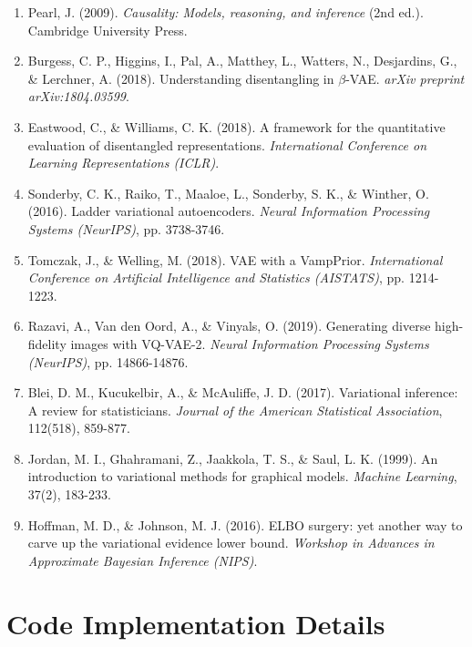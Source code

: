\documentclass[conference]{IEEEtran}
\begin{document}
\begin{enumerate}
    \item Pearl, J. (2009). \textit{Causality: Models, reasoning, and inference} (2nd ed.). Cambridge University Press.
    
    \item Burgess, C. P., Higgins, I., Pal, A., Matthey, L., Watters, N., Desjardins, G., \& Lerchner, A. (2018). Understanding disentangling in $\beta$-VAE. \textit{arXiv preprint arXiv:1804.03599}.
    
    \item Eastwood, C., \& Williams, C. K. (2018). A framework for the quantitative evaluation of disentangled representations. \textit{International Conference on Learning Representations (ICLR)}.
    
    \item Sonderby, C. K., Raiko, T., Maaloe, L., Sonderby, S. K., \& Winther, O. (2016). Ladder variational autoencoders. \textit{Neural Information Processing Systems (NeurIPS)}, pp. 3738-3746.
    
    \item Tomczak, J., \& Welling, M. (2018). VAE with a VampPrior. \textit{International Conference on Artificial Intelligence and Statistics (AISTATS)}, pp. 1214-1223.
    
    \item Razavi, A., Van den Oord, A., \& Vinyals, O. (2019). Generating diverse high-fidelity images with VQ-VAE-2. \textit{Neural Information Processing Systems (NeurIPS)}, pp. 14866-14876.
    
    \item Blei, D. M., Kucukelbir, A., \& McAuliffe, J. D. (2017). Variational inference: A review for statisticians. \textit{Journal of the American Statistical Association}, 112(518), 859-877.
    
    \item Jordan, M. I., Ghahramani, Z., Jaakkola, T. S., \& Saul, L. K. (1999). An introduction to variational methods for graphical models. \textit{Machine Learning}, 37(2), 183-233.
    
    \item Hoffman, M. D., \& Johnson, M. J. (2016). ELBO surgery: yet another way to carve up the variational evidence lower bound. \textit{Workshop in Advances in Approximate Bayesian Inference (NIPS)}.
\end{enumerate}

\appendix
\onecolumn

\section{Code Implementation Details}
\end{document}
